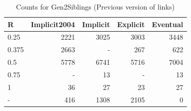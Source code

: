 \documentclass[a4paper]{article}\usepackage[]{graphicx}\usepackage[]{color}
\begin{document}
\begin{table}[ht]
\centering
\begingroup\large
\begin{tabular}{lrrrr}
  \hline
R & Implicit2004 & Implicit & Explicit & Eventual \\ 
  \hline
0.25 & 2221 & 3025 & 3003 & 3448 \\ 
  0.375 & 2663 & - & 267 & 622 \\ 
  0.5 & 5778 & 6741 & 5716 & 7004 \\ 
  0.75 & - &  13 & - &  13 \\ 
  1 &  36 &  27 &  23 &  27 \\ 
  - & 416 & 1308 & 2105 &   0 \\ 
   \hline
\end{tabular}
\endgroup
\caption{Counts for Gen2Siblings (Previous version of links)} 
\end{table}
\end{document}
